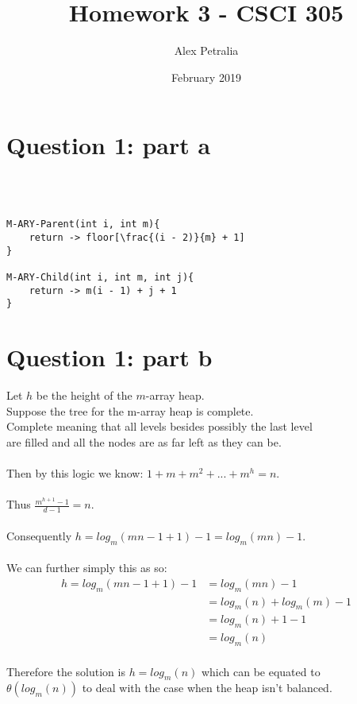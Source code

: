 \documentclass{article}
\title{Homework 3 - CSCI 305}
\author{Alex Petralia}
\date{February 2019}
\begin{document}
\maketitle
\section{Question 1: part a}
\\
\\
\begin{lstlisting}
M-ARY-Parent(int i, int m){
    return -> floor[\frac{(i - 2)}{m} + 1]
}

M-ARY-Child(int i, int m, int j){
    return -> m(i - 1) + j + 1
}
\end{lstlisting}




\section{Question 1: part b}

Let $h$ be the height of the $m$-array heap.
\\Suppose the tree for the m-array heap is complete.
\\Complete meaning that all levels besides possibly the last level
\\are filled and all the nodes are as far left as they can be.
\\
\\Then by this logic we know: $1 + m + m^2 + . . . + m^h = n$.
\\
\\Thus $\frac{m^{h+1} - 1}{d - 1} = n$.
\\
\\Consequently $h = log_{m}(mn - 1 + 1) - 1 = log_{m}(mn) - 1$.
\\
\\We can further simply this as so:
\begin{align}
    \nonumber h = log_{m}(mn - 1 + 1) - 1 &= log_{m}(mn) - 1\\
    \nonumber &= log_{m}(n) + log_{m}(m) - 1\\
    \nonumber &= log_{m}(n) + 1 - 1\\
    \nonumber &= log_{m}(n)
\end{align}
\\Therefore the solution is $h = log_{m}(n)$ which can be equated to 
\\$\theta(log_{m}(n))$ to deal with the case when the heap isn't balanced.
 
\end{document}
